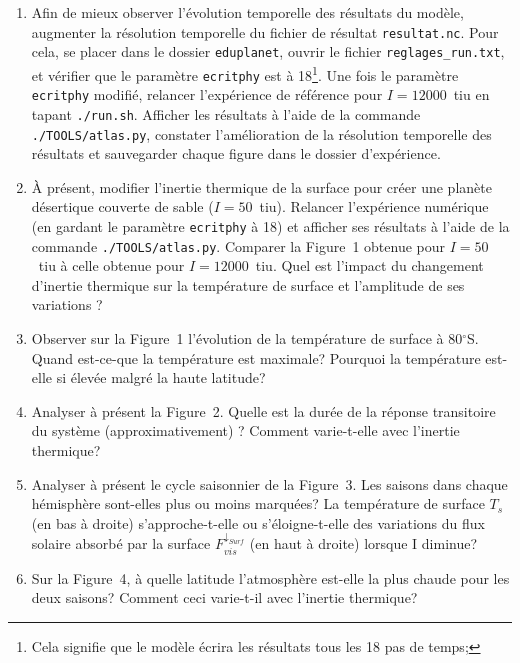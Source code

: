 \documentclass[a4paper,12pt]{article}
\begin{document}
\begin{enumerate}

\item Afin de mieux observer l'évolution temporelle des résultats du modèle,
augmenter la résolution temporelle du fichier de résultat \texttt{resultat.nc}.
Pour cela, se placer dans le dossier \texttt{eduplanet}, ouvrir le fichier
\texttt{reglages\_run.txt}, et vérifier que le paramètre \texttt{ecritphy} est
à 18\footnote{Cela signifie que le modèle écrira les résultats tous les 18 pas
de temps;}. Une fois le paramètre \texttt{ecritphy} modifié, relancer
l'expérience de référence pour $I=12000$~tiu en tapant \texttt{./run.sh}.
Afficher les résultats à l'aide de la commande \texttt{./TOOLS/atlas.py},
constater l'amélioration de la résolution temporelle des résultats et
sauvegarder chaque figure dans le dossier d'expérience.

\item \`A présent, modifier l'inertie thermique de la surface pour créer une
planète désertique couverte de sable ($I=50$~tiu). Relancer l'expérience
numérique (en gardant le paramètre \texttt{ecritphy} à 18) et afficher ses
résultats à l'aide de la commande \texttt{./TOOLS/atlas.py}. Comparer la
Figure~1 obtenue pour $I=50$~tiu à celle obtenue pour $I=12000$~tiu. Quel est
l'impact du changement d'inertie thermique sur la température de surface et
l'amplitude de ses variations ?

\item Observer sur la Figure~1 l'évolution de la température de surface à
80$^\circ$S. Quand est-ce-que la température est maximale? Pourquoi la
température est-elle si élevée malgré la haute latitude?

\item Analyser à présent la Figure~2. Quelle est la durée de la réponse
transitoire du système (approximativement) ? Comment varie-t-elle avec
l'inertie thermique?


\item Analyser à présent le cycle saisonnier de la Figure~3. Les saisons dans
chaque hémisphère sont-elles plus ou moins marquées? La température de surface
$T_s$ (en bas à droite) s'approche-t-elle ou s'éloigne-t-elle des variations du
flux solaire absorbé par la surface $F_{vis}^{\downarrow_{Surf}}$ (en haut à
droite) lorsque I diminue?

\item Sur la Figure~4, à quelle latitude l'atmosphère est-elle la plus chaude
pour les deux saisons? Comment ceci varie-t-il avec l'inertie thermique?

\end{enumerate}
\end{document}
